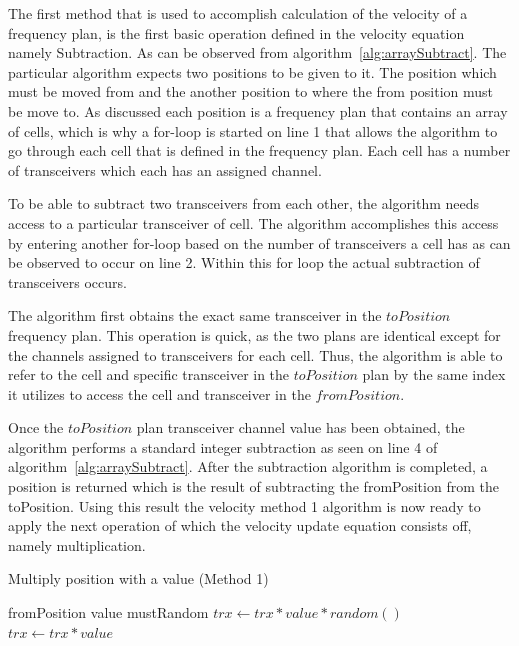 The first method that is used to accomplish calculation of the velocity of a frequency plan, is the first basic operation defined in the velocity equation namely Subtraction. As can be observed from algorithm~\ref{alg:arraySubtract}. The particular algorithm expects two positions to be given to it. The position which must be moved from and the another position to where the from position must be move to. As discussed each position is a frequency plan that contains an array of cells, which is why a for-loop is started on line 1 that allows the algorithm to go through each cell that is defined in the frequency plan. Each cell has a number of transceivers which each has an assigned channel. 

To be able to subtract two transceivers from each other, the algorithm needs access to a particular transceiver of cell. The algorithm accomplishes this access by entering another for-loop based on the number of transceivers a cell has as can be observed to occur on line 2. Within this for loop the actual subtraction of transceivers occurs.

The algorithm first obtains the exact same transceiver in the $toPosition$ frequency plan. This operation is quick, as the two plans are identical except for the channels assigned to transceivers for each cell. Thus, the algorithm is able to refer to the cell and specific transceiver in the $toPosition$ plan by the same index it utilizes to access the cell and transceiver in the $fromPosition$.

Once the $toPosition$ plan transceiver channel value has been obtained, the algorithm performs a standard integer subtraction as seen on line 4 of algorithm~\ref{alg:arraySubtract}.
After the subtraction algorithm is completed, a position is returned which is the result of subtracting the fromPosition from the toPosition. Using this result the velocity method 1 algorithm is now ready to apply the next operation of which the velocity update equation consists off, namely multiplication.

\begin{algorithm}
\caption{Multiply position with a value (Method 1)}
\label{alg:arrayMultiply}
\begin{algorithmic}[1]
	\REQUIRE fromPosition
	\REQUIRE value
	\REQUIRE mustRandom
				\STATE $trx \leftarrow trx * value * random()$
			\ELSE
				\STATE $trx \leftarrow trx * value$
			\ENDIF
		\ENDFOR
	\ENDFOR
\end{algorithmic}
\end{algorithm}


